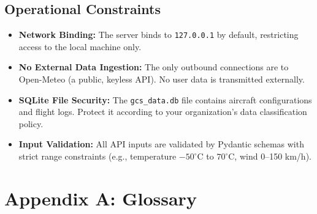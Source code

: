 \documentclass[11pt,a4paper]{article}
\begin{document}
\subsection{Operational Constraints}
\begin{itemize}[noitemsep]
    \item \textbf{Network Binding:} The server binds to \texttt{127.0.0.1} by default, restricting access to the local machine only.
    \item \textbf{No External Data Ingestion:} The only outbound connections are to Open-Meteo (a public, keyless API). No user data is transmitted externally.
    \item \textbf{SQLite File Security:} The \texttt{gcs\_data.db} file contains aircraft configurations and flight logs. Protect it according to your organization's data classification policy.
    \item \textbf{Input Validation:} All API inputs are validated by Pydantic schemas with strict range constraints (e.g., temperature $-50^{\circ}$C to $70^{\circ}$C, wind 0--150 km/h).
\end{itemize}

\newpage

\appendix
\section{Appendix A: Glossary}
\end{document}
